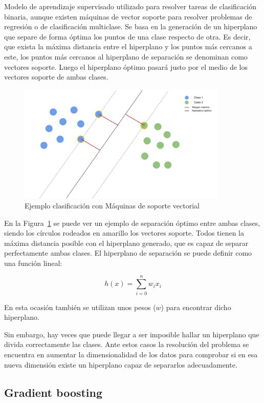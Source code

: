 \documentclass[a4paper, 12pt]{book}
\begin{document}
Modelo de aprendizaje supervisado utilizado para resolver tareas de clasificación binaria, aunque existen máquinas de vector soporte para resolver problemas de regresión o de clasificación multiclase. Se basa en la generación de un hiperplano que separe de forma óptima los puntos de una clase respecto de otra. Es decir, que exista la máxima distancia entre el hiperplano y los puntos más cercanos a este, los puntos más cercanos al hiperplano de separación se denominan como vectores soporte. Luego el hiperplano óptimo pasará justo por el medio de los vectores soporte de ambas clases.

\begin{figure}[]
  \centering
  \includegraphics[width=10cm, keepaspectratio]{img/explicacion_SVM.png}
  \caption{Ejemplo clasificación con Máquinas de soporte vectorial}\label{fig:explicacion_svm}
\end{figure}

En la Figura~\ref{fig:explicacion_svm} se puede ver un ejemplo de separación óptimo entre ambas clases, siendo los círculos rodeados en amarillo los vectores soporte. Todos tienen la máxima distancia posible con el hiperplano generado, que es capaz de separar perfectamente ambas clases. El hiperplano de separación se puede definir como una función lineal:

\begin{equation}
    h(x) = \sum_{i= 0}^{n} w_i x_i
\end{equation}

En esta ocasión también se utilizan unos pesos ($w$) para encontrar dicho hiperplano.

Sin embargo, hay veces que puede llegar a ser imposible hallar un hiperplano que divida correctamente las clases. Ante estos casos la resolución del problema se encuentra en aumentar la dimensionalidad de los datos para comprobar si en esa nueva dimensión existe un hiperplano capaz de separarlos adecuadamente.


\subsection{Gradient boosting}
\label{subsec:gradient_boosting}
\end{document}
